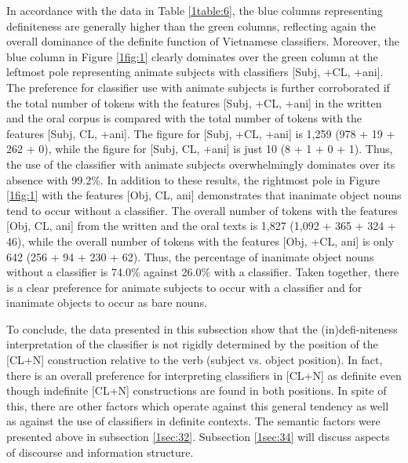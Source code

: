 \documentclass[output=paper]{langsci/langscibook}
\begin{document}
In accordance with the data in Table \ref{1table:6}, the blue columns representing definiteness are generally higher than the green columns, reflecting again the overall dominance of the definite function of Vietnamese classifiers. Moreover, the blue column in Figure \ref{1fig:1} clearly dominates over the green column at the leftmost pole representing animate subjects with classifiers [Subj, +CL, +ani]. The preference for classifier use with animate subjects is further corroborated if the total number of tokens with the features [Subj, +CL, +ani] in the written and the oral corpus is compared with the total number of tokens with the features [Subj, \minus CL, +ani]. The figure for [Subj, +CL, +ani] is 1,259 (978 + 19 + 262 + 0), while the figure for [Subj, \minus CL, +ani] is just 10 (8 + 1 + 0 + 1). Thus, the use of the classifier with animate subjects overwhelmingly dominates over its absence with 99.2\%. In addition to these results, the rightmost pole in Figure \ref{1fig:1} with the features [Obj, \minus CL, \minus ani] demonstrates that inanimate object nouns tend to occur without a classifier. The overall number of tokens with the features [Obj, \minus CL, \minus ani] from the written and the oral texts is 1,827 (1,092 + 365 + 324 + 46), while the overall number of tokens with the features [Obj, +CL, \minus ani] is only 642 (256 + 94 + 230 + 62). Thus, the percentage of inanimate object nouns without a classifier is 74.0\% against 26.0\% with a classifier. Taken together, there is a clear preference for animate subjects to occur with a classifier and for inanimate objects to occur as bare nouns.

\largerpage
To conclude, the data presented in this subsection show that the (in)defi-niteness interpretation of the classifier is not rigidly determined by the position of the [CL+N] construction relative to the verb (subject vs. object position). In fact, there is an overall preference for interpreting classifiers in [CL+N] as definite even though indefinite [CL+N] constructions are found in both positions. In spite of this, there are other factors which operate against this general tendency as well as against the use of classifiers in definite contexts. The semantic factors were presented above in subsection \ref{1sec:32}. Subsection \ref{1sec:34} will discuss aspects of discourse and information structure. 
\end{document}

